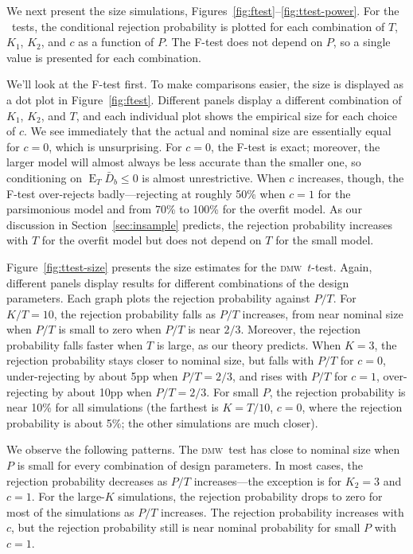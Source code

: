 \documentclass[11pt]{article}
\DeclareMathOperator{\E}{E}
\newcommand{\oosB}{\bar{D}_b}
\newcommand{\dmw}{\textsc{dmw}}
\begin{document}
We next present the size simulations,
Figures~\ref{fig:ftest}--\ref{fig:ttest-power}.  For the \oos\ tests,
the conditional rejection probability is plotted for each combination
of $T$, $K_1$, $K_2$, and $c$ as a function of $P$.  The F-test does
not depend on $P$, so a single value is presented for each
combination.

We'll look at the F-test first.  To make comparisons easier, the size
is displayed as a dot plot in Figure~\ref{fig:ftest}.  Different
panels display a different combination of $K_1$, $K_2$, and $T$, and
each individual plot shows the empirical size for each choice of $c$.
We see immediately that the actual and nominal size are essentially
equal for $c = 0$, which is unsurprising.  For $c = 0$, the F-test is
exact; moreover, the larger model will almost always be less accurate
than the smaller one, so conditioning on $\E_T \oosB \leq 0$ is
almost unrestrictive.  When $c$ increases, though, the F-test
over-rejects badly---rejecting at roughly 50\% when $c = 1$ for the
parsimonious model and from 70\% to 100\% for the overfit model.  As
our discussion in Section~\ref{sec:insample} predicts, the rejection
probability increases with $T$ for the overfit model but does not
depend on $T$ for the small model.

Figure~\ref{fig:ttest-size} presents the size estimates for the \dmw\
$t$-test.  Again, different panels display results for different
combinations of the design parameters.  Each graph plots the rejection
probability against $P/T$.  For $K/T=10$, the rejection probability
falls as $P/T$ increases, from near nominal size when $P/T$ is small
to zero when $P/T$ is near $2/3$.  Moreover, the rejection probability
falls faster when $T$ is large, as our theory predicts.  When $K=3$,
the rejection probability stays closer to nominal size, but falls with
$P/T$ for $c=0$, under-rejecting by about 5pp when $P/T = 2/3$, and
rises with $P/T$ for $c=1$, over-rejecting by about 10pp when
$P/T=2/3$.  For small $P$, the rejection probability is near 10\% for
all simulations (the farthest is $K=T/10$, $c=0$, where the rejection
probability is about 5\%; the other simulations are much closer).

We observe the following patterns.  The
\dmw\ test has close to nominal size when $P$ is small for every
combination of design parameters.  In most cases, the rejection
probability decreases as $P/T$ increases---the exception is for $K_2 =
3$ and $c=1$.  For the large-$K$ simulations, the rejection
probability drops to zero for most of the simulations as $P/T$
increases.  The rejection probability increases with $c$, but the
rejection probability still is near nominal probability for small $P$
with $c=1$.
\end{document}
